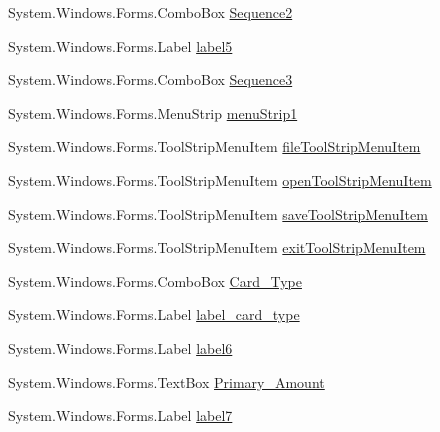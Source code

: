 \begin{DoxyCompactItemize}
\item 
System.\+Windows.\+Forms.\+Combo\+Box \mbox{\hyperlink{class_cert_complete_1_1_test___creation___form_a263aef77ae4c67d2f3319545dee8786d}{Sequence2}}
\item 
System.\+Windows.\+Forms.\+Label \mbox{\hyperlink{class_cert_complete_1_1_test___creation___form_a536e90078201343e1c58f460c4a8762e}{label5}}
\item 
System.\+Windows.\+Forms.\+Combo\+Box \mbox{\hyperlink{class_cert_complete_1_1_test___creation___form_aaedd211ef9d7a81d7df2e804ce5c4dec}{Sequence3}}
\item 
System.\+Windows.\+Forms.\+Menu\+Strip \mbox{\hyperlink{class_cert_complete_1_1_test___creation___form_aadff328df51eeebbfeadb32c26a7b10b}{menu\+Strip1}}
\item 
System.\+Windows.\+Forms.\+Tool\+Strip\+Menu\+Item \mbox{\hyperlink{class_cert_complete_1_1_test___creation___form_a1c5b2b1aa71ceac85b4f42e6728f3300}{file\+Tool\+Strip\+Menu\+Item}}
\item 
System.\+Windows.\+Forms.\+Tool\+Strip\+Menu\+Item \mbox{\hyperlink{class_cert_complete_1_1_test___creation___form_a7737f56ada7d36e2a0c4411fce6e771b}{open\+Tool\+Strip\+Menu\+Item}}
\item 
System.\+Windows.\+Forms.\+Tool\+Strip\+Menu\+Item \mbox{\hyperlink{class_cert_complete_1_1_test___creation___form_aa2d36cb55b74563d18570ab13c6659af}{save\+Tool\+Strip\+Menu\+Item}}
\item 
System.\+Windows.\+Forms.\+Tool\+Strip\+Menu\+Item \mbox{\hyperlink{class_cert_complete_1_1_test___creation___form_a50180142a7984a516f59b9ba79390501}{exit\+Tool\+Strip\+Menu\+Item}}
\item 
System.\+Windows.\+Forms.\+Combo\+Box \mbox{\hyperlink{class_cert_complete_1_1_test___creation___form_a18e29f36992db26a035989cfc555e286}{Card\+\_\+\+Type}}
\item 
System.\+Windows.\+Forms.\+Label \mbox{\hyperlink{class_cert_complete_1_1_test___creation___form_a405d43b9016dd3ae2d35019ad79e4097}{label\+\_\+card\+\_\+type}}
\item 
System.\+Windows.\+Forms.\+Label \mbox{\hyperlink{class_cert_complete_1_1_test___creation___form_a9c029b792ef2c41ab988d6eb17f7a09f}{label6}}
\item 
System.\+Windows.\+Forms.\+Text\+Box \mbox{\hyperlink{class_cert_complete_1_1_test___creation___form_aaa847e85543afcda5caadb6cae7d04fc}{Primary\+\_\+\+Amount}}
\item 
System.\+Windows.\+Forms.\+Label \mbox{\hyperlink{class_cert_complete_1_1_test___creation___form_abd97f97f9adedc2809db35c6d3d107e1}{label7}}

\end{DoxyCompactItemize}
